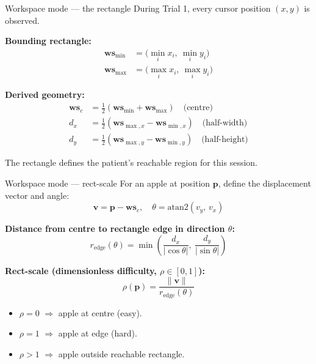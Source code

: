 \documentclass[10pt,aspectratio=169]{beamer}
\begin{document}
\begin{frame}{Workspace mode --- the rectangle}
During Trial 1, every cursor position $(x, y)$ is observed.

\vspace{0.5em}
\textbf{Bounding rectangle:}
\begin{align*}
\mathbf{ws}_{\min} &= \bigl(\min_i x_i,\ \min_i y_i\bigr) \\
\mathbf{ws}_{\max} &= \bigl(\max_i x_i,\ \max_i y_i\bigr)
\end{align*}

\textbf{Derived geometry:}
\begin{align*}
\mathbf{ws}_c &= \tfrac{1}{2}(\mathbf{ws}_{\min} + \mathbf{ws}_{\max}) \quad \text{(centre)} \\
d_x &= \tfrac{1}{2}(\mathbf{ws}_{\max,x} - \mathbf{ws}_{\min,x}) \quad \text{(half-width)} \\
d_y &= \tfrac{1}{2}(\mathbf{ws}_{\max,y} - \mathbf{ws}_{\min,y}) \quad \text{(half-height)}
\end{align*}

The rectangle defines the patient's reachable region for this session.
\end{frame}

\begin{frame}{Workspace mode --- rect-scale}
For an apple at position $\mathbf{p}$, define the displacement vector and angle:
\[
\mathbf{v} = \mathbf{p} - \mathbf{ws}_c, \quad \theta = \mathrm{atan2}(v_y,\, v_x)
\]

\textbf{Distance from centre to rectangle edge in direction $\theta$:}
\[
r_{\text{edge}}(\theta) = \min\!\left( \frac{d_x}{|\cos\theta|},\ \frac{d_y}{|\sin\theta|} \right)
\]

\textbf{Rect-scale (dimensionless difficulty, $\rho \in [0, 1]$):}
\[
\boxed{\rho(\mathbf{p}) = \frac{\|\mathbf{v}\|}{r_{\text{edge}}(\theta)}}
\]

\begin{itemize}
    \item $\rho = 0$ $\Rightarrow$ apple at centre (easy).
    \item $\rho = 1$ $\Rightarrow$ apple at edge (hard).
    \item $\rho > 1$ $\Rightarrow$ apple outside reachable rectangle.
\end{itemize}
\end{frame}
\end{document}
